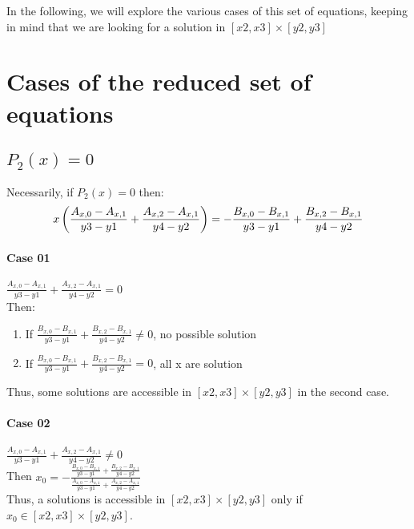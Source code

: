 \documentclass[paper=a4, fontsize=11pt]{scrartcl}
\numberwithin{equation}{section}		%
\numberwithin{figure}{section}			%
\numberwithin{table}{section}				%
\begin{document}
In the following, we will explore the various cases of this set of equations, keeping in mind that we are looking for a solution in $[x2,x3]\times[y2,y3]$

\newpage
\section{Cases of the reduced set of equations}

\subsection{$P_2(x) = 0$}

Necessarily, if $P_2(x)=0$ then:
$$
x\left( \frac{A_{x,0}-A_{x,1}}{y3-y1} + \frac{A_{x,2}-A_{x,1}}{y4-y2} \right) = -\frac{B_{x,0}-B_{x,1}}{y3-y1} + \frac{B_{x,2}-B_{x,1}}{y4-y2}\\
$$

\paragraph{\textbf{Case 01}} $\frac{A_{x,0}-A_{x,1}}{y3-y1} + \frac{A_{x,2}-A_{x,1}}{y4-y2} = 0$\\
Then:
\begin{enumerate}
\item If $\frac{B_{x,0}-B_{x,1}}{y3-y1} + \frac{B_{x,2}-B_{x,1}}{y4-y2} \neq 0$, no possible solution
\item If $\frac{B_{x,0}-B_{x,1}}{y3-y1} + \frac{B_{x,2}-B_{x,1}}{y4-y2} = 0$, all x are solution
\end{enumerate}

Thus, some solutions are accessible in $[x2,x3]\times[y2,y3]$ in the second case.

\paragraph{\textbf{Case 02}} $\frac{A_{x,0}-A_{x,1}}{y3-y1} + \frac{A_{x,2}-A_{x,1}}{y4-y2} \neq 0$\\
Then $x_0 = -\frac{\frac{B_{x,0}-B_{x,1}}{y3-y1} + \frac{B_{x,2}-B_{x,1}}{y4-y2}}{\frac{A_{x,0}-A_{x,1}}{y3-y1} + \frac{A_{x,2}-A_{x,1}}{y4-y2}}$\\
Thus, a solutions is accessible in $[x2,x3]\times[y2,y3]$ only if $x_0 \in [x2,x3]\times[y2,y3]$.\\
\end{document}

